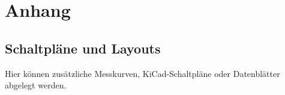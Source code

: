 \documentclass[12pt,a4paper]{article}
\begin{document}
\newpage
\printbibliography[heading=bibintoc,title={Literaturverzeichnis}]

\newpage
\appendix
\section{Anhang}
\subsection{Schaltpläne und Layouts}
Hier können zusätzliche Messkurven, KiCad-Schaltpläne oder Datenblätter abgelegt werden.
\end{document}
